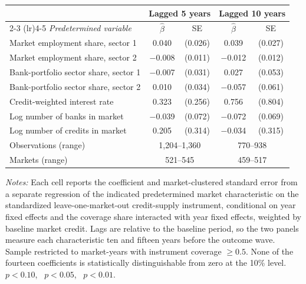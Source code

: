 \begin{threeparttable}
    \begin{tabular}{lcccc}
        \toprule
        & \multicolumn{2}{c}{\textbf{Lagged 5 years}} & \multicolumn{2}{c}{\textbf{Lagged 10 years}} \\
        \cmidrule(lr){2-3} \cmidrule(lr){4-5}
        \textit{Predetermined variable} & $\widehat{\beta}$ & SE & $\widehat{\beta}$ & SE \\
        \midrule
        Market employment share, sector 1     & \phantom{$-$}0.040 & (0.026) & \phantom{$-$}0.039 & (0.027) \\
        Market employment share, sector 2     & $-$0.008 & (0.011) & $-$0.012 & (0.012) \\
        Bank-portfolio sector share, sector 1 & $-$0.007 & (0.031) & \phantom{$-$}0.027 & (0.053) \\
        Bank-portfolio sector share, sector 2 & \phantom{$-$}0.010 & (0.034) & $-$0.057 & (0.061) \\
        Credit-weighted interest rate         & \phantom{$-$}0.323 & (0.256) & \phantom{$-$}0.756 & (0.804) \\
        Log number of banks in market         & $-$0.039 & (0.072) & $-$0.072 & (0.069) \\
        Log number of credits in market       & \phantom{$-$}0.205 & (0.314) & $-$0.034 & (0.315) \\
        \midrule
        Observations (range) & \multicolumn{2}{c}{1{,}204--1{,}360} & \multicolumn{2}{c}{770--938} \\
        Markets (range)      & \multicolumn{2}{c}{521--545} & \multicolumn{2}{c}{459--517} \\
        \bottomrule
    \end{tabular}
    \begin{tablenotes}[flushleft]
        \footnotesize
        \item \textit{Notes:} Each cell reports the coefficient and market-clustered standard error from a separate regression of the indicated predetermined market characteristic on the standardized leave-one-market-out credit-supply instrument, conditional on year fixed effects and the coverage share interacted with year fixed effects, weighted by baseline market credit. Lags are relative to the baseline period, so the two panels measure each characteristic ten and fifteen years before the outcome wave. Sample restricted to market-years with instrument coverage $\geq 0.5$. None of the fourteen coefficients is statistically distinguishable from zero at the 10\% level. \sym{*}~$p<0.10$, \sym{**}~$p<0.05$, \sym{***}~$p<0.01$.
    \end{tablenotes}
    \end{threeparttable}